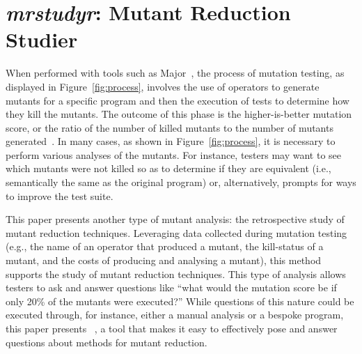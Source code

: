 
\section{\textit{mrstudyr}: Mutant Reduction Studier}





When performed with tools such as Major~\cite{Just2011b}, the process of mutation testing, as displayed in
Figure~\ref{fig:process}, involves the use of operators to generate mutants for a specific program and then the
execution of tests to determine how they kill the mutants. The outcome of this phase is the higher-is-better mutation
score, or the ratio of the number of killed mutants to the number of mutants generated~\cite{Just2011a}. In many cases,
as shown in Figure~\ref{fig:process}, it is necessary to perform various analyses of the mutants. For instance, testers
may want to see which mutants were not killed so as to determine if they are equivalent (i.e., semantically the same as
the original program) or, alternatively, prompts for ways to improve the test suite.


This paper presents another type of mutant analysis: the retrospective study of mutant reduction techniques. Leveraging
data collected during mutation testing (e.g., the name of an operator that produced a mutant, the kill-status of a
mutant, and the costs of producing and analysing a mutant), this method supports the study of mutant reduction
techniques. This type of analysis allows testers to ask and answer questions like ``what would the mutation score be if
only 20\% of the mutants were executed?'' While questions of this nature could be executed through, for instance, either
a manual analysis or a bespoke program, this paper presents \mr~, a tool that makes it easy to effectively pose and
answer questions about methods for mutant reduction.



